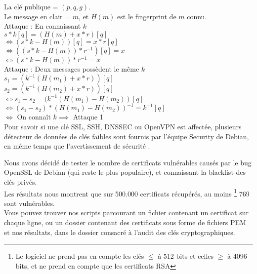 		La clé publique = $(p, q, g)$.\\
		Le message en clair = $m$, et $H(m)$ est le fingerprint de $m$ connu.\\
	
		Attaque  : En connaissant $k$	\\
		$s * k [q] = (H(m) + x*r) [q]$\\
		$\iff (s * k - H(m)) [q] = x*r [q]$\\
		$\iff ((s*k - H(m))*r^{-1})[q] = x$\\
		$\iff (s*k - H(m))*r^{-1} = x$\\

		Attaque  : Deux messages possèdent le même $k$\\
		$s_1 = (k^{-1} (H(m_1) + x*r)) [q]$\\
		$s_2 = (k^{-1} (H(m_2) + x*r)) [q]$\\
		$\iff s_1 - s_2 = (k^{-1} (H(m_1) - H(m_2)) [q]$\\
		$\iff (s_1 - s_2)*(H(m_1) - H(m_2))^{-1} = k^{-1} [q]$\\
		$\iff$ On connaît $k \implies$ Attaque 1\\

		Pour savoir si une clé SSL, SSH, DNSSEC ou OpenVPN est affectée, 
		plusieurs détecteur de données \cite{dowkd.pl} 
		\cite{openssl-blacklist} de clés faibles sont 
		fournis par l'équipe Security de Debian, en même temps que
		l'avertissement de sécurité \cite{debian2008bug}.\\ 


		Nous avons décidé de tester le nombre de certificats vulnérables 
		causés 	par le bug OpenSSL de Debian (qui reste le plus populaire), et
		connaissant la blacklist des clés privés. \\
	
		Les résultats nous montrent que sur 500.000 certificats récupérés, au moins
		\footnote{Le logiciel ne prend pas en compte les clés $\leq$ à 512 bits et 
		celles $\geq$ à 4096 bits, et ne prend en compte que les certificats RSA} 
		769 sont vulnérables.\\
		
		Vous pouvez trouver nos scripts parcourant un fichier contenant un 
		certificat sur chaque ligne, ou un dossier contenant des certificats sous 
		forme de fichiers PEM et nos résultats, dans le dossier consacré à l'audit des clés
		cryptographiques.\\
		
